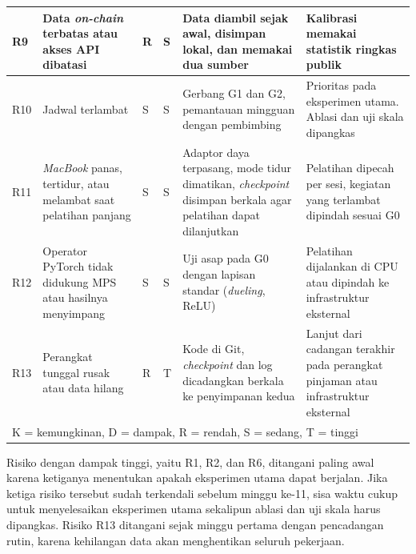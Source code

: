 \begin{table}[htbp]
\begin{tabular}{|p{0.6cm}|p{2.7cm}|p{0.6cm}|p{0.6cm}|p{3.6cm}|p{3.2cm}|}
\hline
R9 & Data \textit{on-chain} terbatas atau akses API dibatasi & R & S & Data diambil sejak awal, disimpan lokal, dan memakai dua sumber & Kalibrasi memakai statistik ringkas publik \\
\hline
R10 & Jadwal terlambat & S & S & Gerbang G1 dan G2, pemantauan mingguan dengan pembimbing & Prioritas pada eksperimen utama. Ablasi dan uji skala dipangkas \\
\hline
R11 & \textit{MacBook} panas, tertidur, atau melambat saat pelatihan panjang & S & S & Adaptor daya terpasang, mode tidur dimatikan, \textit{checkpoint} disimpan berkala agar pelatihan dapat dilanjutkan & Pelatihan dipecah per sesi, kegiatan yang terlambat dipindah sesuai G0 \\
\hline
R12 & Operator PyTorch tidak didukung MPS atau hasilnya menyimpang & S & S & Uji asap pada G0 dengan lapisan standar (\textit{dueling}, ReLU) & Pelatihan dijalankan di CPU atau dipindah ke infrastruktur eksternal \\
\hline
R13 & Perangkat tunggal rusak atau data hilang & R & T & Kode di Git, \textit{checkpoint} dan log dicadangkan berkala ke penyimpanan kedua & Lanjut dari cadangan terakhir pada perangkat pinjaman atau infrastruktur eksternal \\
\hline
\multicolumn{6}{|l|}{K = kemungkinan, D = dampak, R = rendah, S = sedang, T = tinggi} \\
\hline
\end{tabular}
\end{table}
Risiko dengan dampak tinggi, yaitu R1, R2, dan R6, ditangani paling awal karena ketiganya menentukan apakah eksperimen utama dapat berjalan. Jika ketiga risiko tersebut sudah terkendali sebelum minggu ke-11, sisa waktu cukup untuk menyelesaikan eksperimen utama sekalipun ablasi dan uji skala harus dipangkas. Risiko R13 ditangani sejak minggu pertama dengan pencadangan rutin, karena kehilangan data akan menghentikan seluruh pekerjaan.